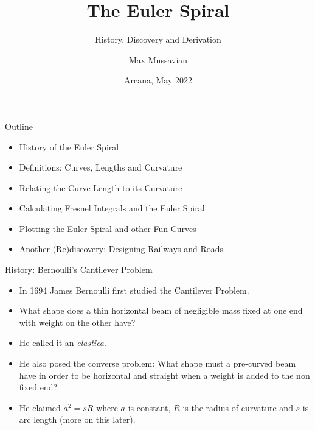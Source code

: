 \documentclass{beamer}
\title{The Euler Spiral}
\subtitle{History, Discovery and Derivation}
\author{Max Mussavian}
\date[2022]{Arcana, May 2022}
\begin{document}
\begin{frame}[plain]
    \maketitle
\end{frame}
\begin{frame}{Outline}
	\begin{itemize}
		\item History of the Euler Spiral
		\item Definitions: Curves, Lengths and Curvature
		\item Relating the Curve Length to its Curvature
		\item Calculating Fresnel Integrals and the Euler Spiral
		\item Plotting the Euler Spiral and other Fun Curves
		\item Another (Re)discovery: Designing Railways and Roads
	\end{itemize}
\end{frame}

\begin{frame}{History: Bernoulli's Cantilever Problem}
	\begin{itemize}
	\item In 1694 James Bernoulli first studied the Cantilever Problem.
	\item What shape does a thin horizontal beam of negligible mass fixed at one end with weight on the other have?
	\item He called it an \emph{elastica}.
	\item He also posed the converse problem: What shape must a pre-curved beam have in order to be horizontal and straight when a weight is added to the non fixed end?
	\item He claimed $a^2=s R$ where $a$ is constant, $R$ is the radius of curvature and $s$ is arc length (more on this later).
	\end{itemize}
\end{frame}
\end{document}
